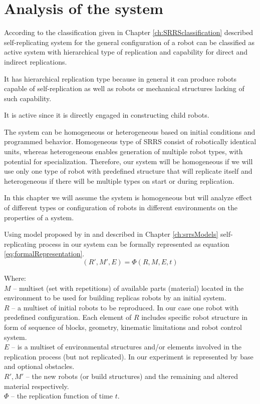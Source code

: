 
\section{Analysis of the system}

According to the classification given in Chapter \ref{ch:SRRSclassification} 
described self-replicating system for 
the general configuration of a robot can be classified as active system with 
hierarchical type of replication and capability for direct and indirect replications. 

It has hierarchical replication type because in general it can produce 
robots capable of self-replication as well as robots or mechanical structures 
lacking of such capability.

It is active since it is directly engaged in constructing child robots. 

The system can be homogeneous or heterogeneous based on initial conditions and programmed 
behavior. 
Homogeneous type of SRRS consist of robotically identical units, whereas heterogeneous 
enables generation of multiple robot types, with potential for specialization.
Therefore, our system will  be homogeneous if we will use only one type of robot with predefined 
structure that will replicate itself and heterogeneous if there will be multiple types 
on start or during replication.

In this chapter we will assume the system is homogeneous but will 
analyze effect of different types or configuration of robots in different environments
on the properties of a system.

Using model proposed by \citeauthor{Lee2007Robotic} in \cite{Lee2007Robotic} 
and described in Chapter \ref{ch:srrsModels}  self-replicating process in our system 
can be formally represented as equation \ref{eq:formalRepresentation}.
\begin{equation}
    \label{eq:formalRepresentation}
    (R' , M' , E ) = \Phi(R, M, E, t) 
\end{equation}

Where:\\
$M$ -- multiset (set with repetitions) of available parts (material) located in the environment
to be used for building replicas robots by an initial system.\\
$R$ --  a multiset of initial robots to be reproduced. In our case one robot with predefined 
configuration. Each element of $R$ includes specific robot structure in form of 
sequence of blocks, geometry, kinematic limitations and robot control system.\\
$E$ -- is a multiset of environmental structures and/or elements involved in the replication
process (but not replicated). In our experiment is represented by base and optional obstacles.\\
$R',M'$ -- the new robots (or build structures) and the remaining and altered material respectively.\\
$\Phi$ -- the replication function of time $t$.


